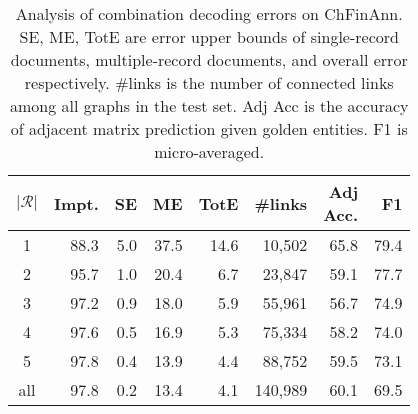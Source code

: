\begin{table}[bth]
    \centering
    \small
    \begin{tabular}{crrrrrrr}
        \toprule
        $|\mathcal{R}|$ & Impt. & SE & ME & TotE & \#links & \makecell{Adj\\Acc.} & F1 \\
        \midrule
        1 & 88.3 & 5.0 & 37.5 & 14.6 & 10,502 & 65.8 & 79.4 \\
        2 & 95.7 & 1.0 & 20.4 & 6.7 & 23,847 & 59.1 & 77.7 \\
        3 & 97.2 & 0.9 & 18.0 & 5.9 & 55,961 & 56.7 & 74.9 \\
        4 & 97.6 & 0.5 & 16.9 & 5.3 & 75,334 & 58.2 & 74.0 \\
        5 & 97.8 & 0.4 & 13.9 & 4.4 & 88,752 & 59.5 & 73.1 \\
        all & 97.8 & 0.2 & 13.4 & 4.1 & 140,989 & 60.1 & 69.5 \\
        \bottomrule
    \end{tabular}
    \caption{
        Analysis of combination decoding errors on ChFinAnn.
        SE, ME, TotE are error upper bounds of single-record documents, multiple-record documents, and overall error respectively.
        \#links is the number of connected links among all graphs in the test set.
        Adj Acc is the accuracy of adjacent matrix prediction given golden entities.
        F1 is micro-averaged.
    }
    \label{tab:upper_bound}
\end{table}
